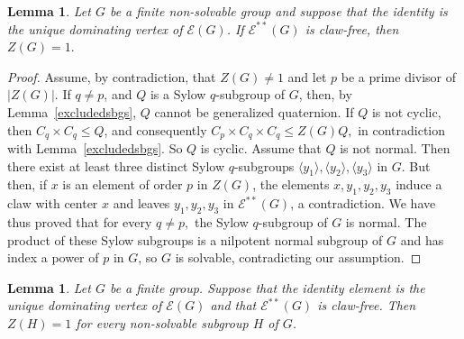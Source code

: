 \documentclass[preprint,11pt]{elsarticle}
\newtheorem{lemma}[theorem]{\bf Lemma}
\begin{document}





\begin{lemma}\label{Thm:non-solvable-claw-free-Z(G)=e}
	Let $G$ be a finite non-solvable group and suppose that the identity is the unique dominating vertex of $\mathcal{E}(G)$. If $\mathcal{E}^{**}(G)$ is claw-free, then $Z(G)=1.$
\end{lemma}

\begin{proof}
	Assume, by contradiction, that $Z(G)\neq 1$ and let $p$ be a prime divisor of $|Z(G)|.$ If $q\neq p$, and $Q$ is a Sylow $q$-subgroup of $G$, then, by Lemma~\ref{excludedsbgs}, $Q$ cannot be generalized quaternion. If $Q$ is not cyclic, then $C_q \times C_q\leq Q$, and consequently $C_p \times C_q \times C_q\leq Z(G)Q,$ in contradiction with Lemma~\ref{excludedsbgs}.
	So $Q$ is cyclic. Assume that $Q$ is not normal. Then there exist at least three distinct Sylow $q$-subgroups $\langle y_1\rangle, \langle y_2\rangle, \langle y_3\rangle$ in $G$. But then, if $x$ is an element of order $p$ in $Z(G)$, the elements $x, y_1, y_2, y_3$ induce a claw with center $x$ and leaves $y_1, y_2, y_3$ in $\mathcal{E}^{**}(G)$, a contradiction.
	We have thus proved that for every $q\neq p,$ the Sylow $q$-subgroup of $G$ is normal. The product of these Sylow subgroups is a nilpotent normal subgroup of $G$ and has index a power of $p$ in $G$, so $G$ is solvable, contradicting our assumption.
\end{proof}


 \begin{lemma}\label{nocenters}
 	Let $G$ be a finite group. Suppose that the identity element is the unique dominating vertex of $\mathcal{E}(G)$ and that $\mathcal{E}^{**}(G)$ is claw-free. Then $Z(H)=1$
 	for every non-solvable subgroup $H$ of $G$.
 \end{lemma}
 
\end{document}
